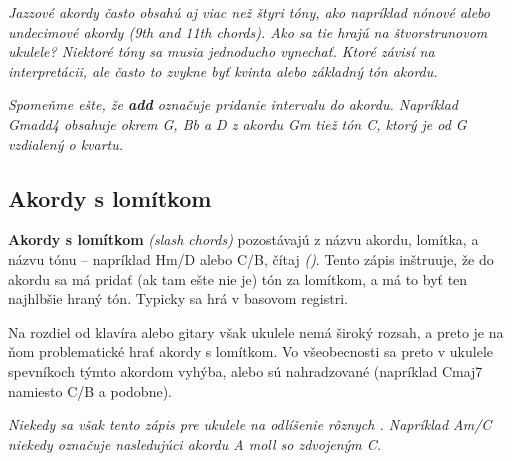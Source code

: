 \bigskip

\textit{%
Jazzové akordy často obsahú aj viac než štyri tóny, ako napríklad nónové alebo undecimové akordy (9th and 11th chords). Ako sa tie hrajú na štvorstrunovom ukulele? Niektoré tóny sa musia jednoducho vynechať. Ktoré závisí na interpretácii, ale často to zvykne byť kvinta alebo základný tón akordu.
}

\textit{%
Spomeňme ešte, že \textbf{add} označuje pridanie intervalu do akordu. Napríklad Gmadd4 obsahuje okrem G, Bb a D z akordu Gm tiež tón C, ktorý je od G vzdialený o kvartu.
}

\subsection*{Akordy s lomítkom}

\textbf{Akordy s lomítkom} \textit{(slash chords)} pozostávajú z názvu akordu, lomítka, a názvu tónu
-- napríklad Hm/D alebo C/B, čítaj  \textit{()}. Tento zápis inštruuje, že do akordu
sa má pridať (ak tam ešte nie je) tón za lomítkom, a má to byť ten najhlbšie hraný tón. Typicky sa hrá v basovom registri.

Na rozdiel od klavíra alebo gitary však ukulele nemá široký rozsah, a preto je na ňom problematické
hrať akordy s lomítkom. Vo všeobecnosti sa preto v ukulele spevníkoch týmto akordom vyhýba,
alebo sú nahradzované (napríklad Cmaj7 namiesto C/B a podobne).

\textit{%
Niekedy sa však tento zápis pre ukulele  na odlíšenie rôznych .
Napríklad Am/C niekedy označuje nasledujúci  akordu A moll so zdvojeným C.
}

\begin{center}
\end{center}


\endgroup